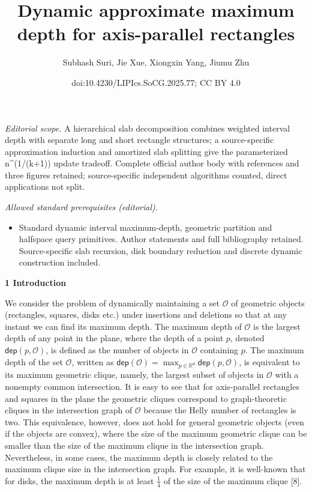 \documentclass[10pt,a4paper]{article}
\title{Dynamic approximate maximum depth for axis-parallel rectangles}
\author{Subhash Suri, Jie Xue, Xiongxin Yang, Jiumu Zhu}
\date{doi:10.4230/LIPIcs.SoCG.2025.77; CC BY 4.0}
\begin{document}
\maketitle
\noindent\textit{Editorial scope.} A hierarchical slab decomposition combines weighted interval depth with separate long and short rectangle structures; a source-specific approximation induction and amortized slab splitting give the parameterized n\textasciicircum{}(1/(k+1)) update tradeoff. Complete official author body with references and three figures retained; source-specific independent algorithms counted, direct applications not split.\par\medskip
\noindent\textit{Allowed standard prerequisites (editorial).}\begin{itemize}
\item Standard dynamic interval maximum-depth, geometric partition and halfspace query primitives. Author statements and full bibliography retained. Source-specific slab recursion, disk boundary reduction and discrete dynamic construction included.
\end{itemize}\medskip
\par\medskip\noindent\textbf{1 Introduction}\par
We consider the problem of dynamically maintaining a set $\mathcal{O}$ of geometric objects (rectangles, squares, disks etc.) under insertions and deletions so that at any instant we can find its maximum depth. The maximum depth of $\mathcal{O}$ is the largest depth of any point in the plane, where the depth of a point $p$, denoted ${\mathsf{dep}}(p,\mathcal{O})$, is defined as the number of objects in $\mathcal{O}$ containing $p$. The maximum depth of the set $\mathcal{O}$, written as ${\mathsf{dep}}(\mathcal{O})=\max_{p\in\mathbb{R}^{d}}{\mathsf{dep}}(p,\mathcal%
{O})$, is equivalent to its maximum geometric clique, namely, the largest subset of objects in $\mathcal{O}$ with a nonempty common intersection. It is easy to see that for axis-parallel rectangles and squares in the plane the geometric cliques correspond to graph-theoretic cliques in the intersection graph of $\mathcal{O}$ because the Helly number of rectangles is two. This equivalence, however, does not hold for general geometric objects (even if the objects are convex), where the size of the maximum geometric clique can be smaller than the size of the maximum clique in the intersection graph. Nevertheless, in some cases, the maximum depth is closely related to the maximum clique size in the intersection graph. For example, it is well-known that for disks, the maximum depth is at least $\frac{1}{4}$ of the size of the maximum clique [8].
\end{document}
